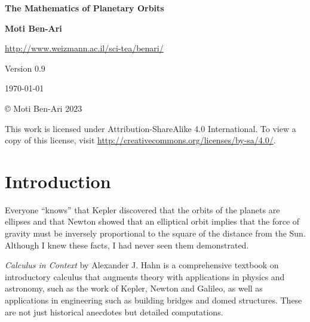 

\thispagestyle{empty}

\begin{center}
\textbf{\LARGE The Mathematics of Planetary Orbits}

\bigskip
\bigskip
\bigskip

\textbf{\Large Moti Ben-Ari}

\bigskip

\url{http://www.weizmann.ac.il/sci-tea/benari/}

\bigskip
\bigskip
\bigskip

Version $0.9$

\bigskip

\today

\end{center}

\vfill

\begin{center}
\copyright{} Moti Ben-Ari $2023$
\end{center}
 
\begin{small}
This work is licensed under Attribution-ShareAlike 4.0 International. To view a copy of this license, visit \url{http://creativecommons.org/licenses/by-sa/4.0/}.
\end{small}

\newpage

\tableofcontents

\newpage

\section{Introduction}

Everyone ``knows'' that Kepler discovered that the orbits of the planets are ellipses and that Newton showed that an elliptical orbit implies that the force of gravity must be inversely proportional to the square of the distance from the Sun. Although I knew these facts, I had never seen them demonstrated.

\textit{Calculus in Context} \cite{hahn-cic} by Alexander J. Hahn is a comprehensive textbook on introductory calculus that augments theory with  applications in physics and astronomy, such as the work of Kepler, Newton and Galileo, as well as applications in engineering such as building bridges and domed structures. These are not just historical anecdotes but detailed computations.

